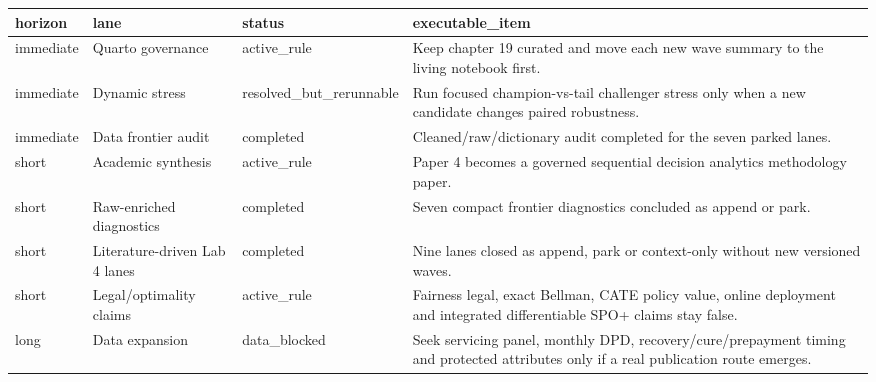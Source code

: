 \documentclass[
  spanish,
  11pt,
  letterpaper,
]{scrbook}
\newcounter{none} %
\theoremstyle{plain}
\theoremstyle{remark}
\begin{document}
{\def\LTcaptype{none} %
\begin{longtable}[]{@{}
  >{\raggedright\arraybackslash}p{}
  >{\raggedright\arraybackslash}p{}
  >{\raggedright\arraybackslash}p{}
  >{\raggedright\arraybackslash}p{}@{}}
\toprule\noalign{}
\begin{minipage}[b]{\linewidth}\raggedright
horizon
\end{minipage} & \begin{minipage}[b]{\linewidth}\raggedright
lane
\end{minipage} & \begin{minipage}[b]{\linewidth}\raggedright
status
\end{minipage} & \begin{minipage}[b]{\linewidth}\raggedright
executable\_item
\end{minipage} \\
\midrule\noalign{}
\endhead
\bottomrule\noalign{}
\endlastfoot
immediate & Quarto governance & active\_rule & Keep chapter 19 curated
and move each new wave summary to the living notebook first. \\
immediate & Dynamic stress & resolved\_but\_rerunnable & Run focused
champion-vs-tail challenger stress only when a new candidate changes
paired robustness. \\
immediate & Data frontier audit & completed & Cleaned/raw/dictionary
audit completed for the seven parked lanes. \\
short & Academic synthesis & active\_rule & Paper 4 becomes a governed
sequential decision analytics methodology paper. \\
short & Raw-enriched diagnostics & completed & Seven compact frontier
diagnostics concluded as append or park. \\
short & Literature-driven Lab 4 lanes & completed & Nine lanes closed as
append, park or context-only without new versioned waves. \\
short & Legal/optimality claims & active\_rule & Fairness legal, exact
Bellman, CATE policy value, online deployment and integrated
differentiable SPO+ claims stay false. \\
long & Data expansion & data\_blocked & Seek servicing panel, monthly
DPD, recovery/cure/prepayment timing and protected attributes only if a
real publication route emerges. \\
\end{longtable}
}
\end{document}

